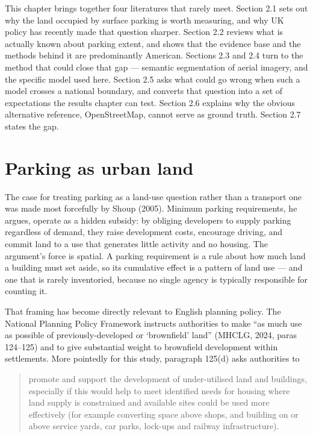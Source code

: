 This chapter brings together four literatures that rarely meet. Section 2.1 sets out why the land occupied by surface parking is worth measuring, and why UK policy has recently made that question sharper. Section 2.2 reviews what is actually known about parking extent, and shows that the evidence base and the methods behind it are predominantly American. Sections 2.3 and 2.4 turn to the method that could close that gap --- semantic segmentation of aerial imagery, and the specific model used here. Section 2.5 asks what could go wrong when such a model crosses a national boundary, and converts that question into a set of expectations the results chapter can test. Section 2.6 explains why the obvious alternative reference, OpenStreetMap, cannot serve as ground truth. Section 2.7 states the gap.

\hypertarget{parking-as-urban-land}{%
\section{Parking as urban land}\label{parking-as-urban-land}}

The case for treating parking as a land-use question rather than a transport one was made most forcefully by Shoup (2005). Minimum parking requirements, he argues, operate as a hidden subsidy: by obliging developers to supply parking regardless of demand, they raise development costs, encourage driving, and commit land to a use that generates little activity and no housing. The argument's force is spatial. A parking requirement is a rule about how much land a building must set aside, so its cumulative effect is a pattern of land use --- and one that is rarely inventoried, because no single agency is typically responsible for counting it.

That framing has become directly relevant to English planning policy. The National Planning Policy Framework instructs authorities to make ``as much use as possible of previously-developed or `brownfield' land'' (MHCLG, 2024, paras 124--125) and to give substantial weight to brownfield development within settlements. More pointedly for this study, paragraph 125(d) asks authorities to

\begin{quote}
promote and support the development of under-utilised land and buildings, especially if this would help to meet identified needs for housing where land supply is constrained and available sites could be used more effectively (for example converting space above shops, and building on or above service yards, car parks, lock-ups and railway infrastructure).
\end{quote}

